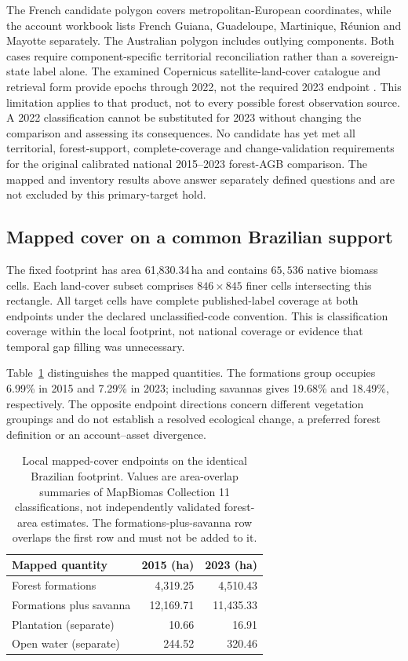 \documentclass[11pt,a4paper]{article}
\begin{document}
The French candidate polygon covers metropolitan-European coordinates, while the account workbook lists French Guiana, Guadeloupe, Martinique, R\'eunion and Mayotte separately. The Australian polygon includes outlying components. Both cases require component-specific territorial reconciliation rather than a sovereign-state label alone. The examined Copernicus satellite-land-cover catalogue and retrieval form provide epochs through 2022, not the required 2023 endpoint \citep{CDS2026}. This limitation applies to that product, not to every possible forest observation source. A 2022 classification cannot be substituted for 2023 without changing the comparison and assessing its consequences. No candidate has yet met all territorial, forest-support, complete-coverage and change-validation requirements for the original calibrated national 2015--2023 forest-AGB comparison. The mapped and inventory results above answer separately defined questions and are not excluded by this primary-target hold.

\subsection{Mapped cover on a common Brazilian support}
The fixed footprint has area 61,830.34\,ha and contains $65{,}536$ native biomass cells. Each land-cover subset comprises $846\times845$ finer cells intersecting this rectangle. All target cells have complete published-label coverage at both endpoints under the declared unclassified-code convention. This is classification coverage within the local footprint, not national coverage or evidence that temporal gap filling was unnecessary.

Table~\ref{tab:brazil_cover} distinguishes the mapped quantities. The formations group occupies 6.99\% in 2015 and 7.29\% in 2023; including savannas gives 19.68\% and 18.49\%, respectively. The opposite endpoint directions concern different vegetation groupings and do not establish a resolved ecological change, a preferred forest definition or an account--asset divergence.

\begin{table}[htbp]
\centering\small
\caption{Local mapped-cover endpoints on the identical Brazilian footprint. Values are area-overlap summaries of MapBiomas Collection 11 classifications, not independently validated forest-area estimates. The formations-plus-savanna row overlaps the first row and must not be added to it.}\label{tab:brazil_cover}
\begin{tabular}{lrr}
\toprule
Mapped quantity & 2015 (ha) & 2023 (ha)\\\midrule
Forest formations & 4,319.25 & 4,510.43 \\
Formations plus savanna & 12,169.71 & 11,435.33 \\
Plantation (separate) & 10.66 & 16.91 \\
Open water (separate) & 244.52 & 320.46 \\
\bottomrule
\end{tabular}
\end{table}
\end{document}

